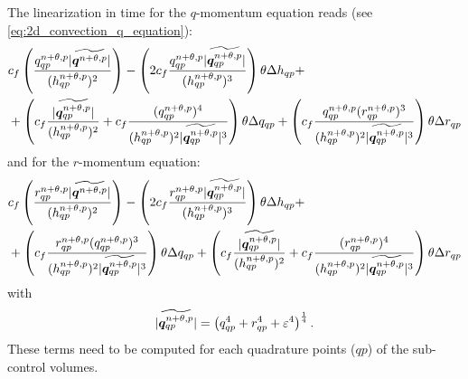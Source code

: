 The linearization in time for the $q$-momentum equation reads (see \autoref{eq:2d_convection_q_equation}):
\begin{align}
        &c_f \left( \frac{q^{n+\theta,p}_{qp}\lvert \widetilde{\bm{q}^{n+\theta,p}} \rvert}{(h^{n+\theta,p}_{qp})^2} \right)
        - \left( 2 c_f \frac{ q^{n+\theta,p}_{qp} \lvert \widetilde{\bm{q}^{n+\theta,p}_{qp}} \rvert }{(h^{n+\theta,p}_{qp})^3} \right) \theta \Delta h_{qp} +
        \\*
        & +
        \left( c_f \frac{\lvert \widetilde{\bm{q}^{n+\theta,p}_{qp}} \rvert}{(h^{n+\theta,p}_{qp})^2} + c_f \frac{(q^{n+\theta,p}_{qp})^4}{(h^{n+\theta,p}_{qp})^2\lvert \widetilde{\bm{q}^{n+\theta,p}_{qp}} \rvert^3} \right) \theta \Delta q_{qp}
        + \left( c_f \frac{q^{n+\theta,p}_{qp}(r^{n+\theta,p}_{qp})^3}
        {(h^{n+\theta,p}_{qp})^2\lvert \widetilde{\bm{q}^{n+\theta,p}_{qp}} \rvert^3 } \right) \theta \Delta r_{qp}
 \end{align}
and for the $r$-momentum equation:
\begin{align}
        &c_f \left( \frac{r^{n+\theta,p}_{qp}\lvert \widetilde{\bm{q}^{n+\theta,p}} \rvert}{(h^{n+\theta,p}_{qp})^2} \right)
        - \left( 2 c_f \frac{ r^{n+\theta,p}_{qp} \lvert \widetilde{\bm{q}^{n+\theta,p}_{qp}} \rvert} {(h^{n+\theta,p}_{qp})^3} \right) \theta \Delta h_{qp} +
        \\*
        & + \left( c_f \frac{r^{n+\theta,p}_{qp}(q^{n+\theta,p}_{qp})^3}
        {(h^{n+\theta,p}_{qp})^2\lvert \widetilde{\bm{q}^{n+\theta,p}_{qp}} \rvert^3 }\right) \theta \Delta q_{qp}
        + \left( c_f \frac{\lvert \widetilde{\bm{q}^{n+\theta,p}_{qp}} \rvert}{(h^{n+\theta,p}_{qp})^2}
        + c_f \frac{(r^{n+\theta,p}_{qp})^4}{(h^{n+\theta,p}_{qp})^2\lvert \widetilde{\bm{q}^{n+\theta,p}_{qp}} \rvert^3} \right) \theta \Delta r_{qp}
\end{align}
with
\begin{align}
    \lvert \widetilde{\bm{q}^{n+\theta,p}_{qp}} \rvert = \left( q^4_{qp} + r^4_{qp} + \varepsilon^4 \right)^{\frac{1}{4}}.
\end{align}
These terms need to be computed for each quadrature points ($qp$) of the sub-control volumes.

